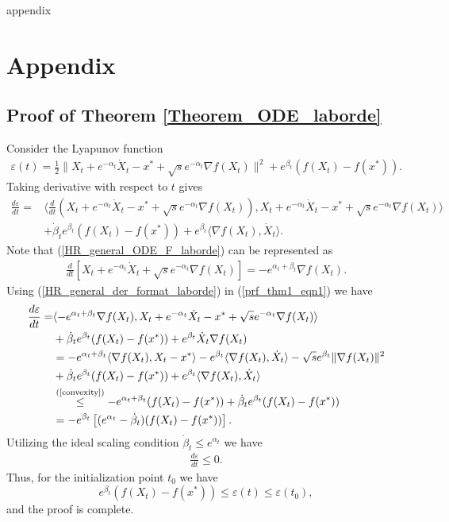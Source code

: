 \documentclass{article}
\theoremstyle{plain}
\theoremstyle{definition}
\theoremstyle{remark}
\begin{document}




appendix
\section{Appendix}
\subsection{Proof of Theorem \ref{Theorem_ODE_laborde}}\label{thm1_proof}
Consider the Lyapunov function 
\begin{align}\label{lyap_theorem_C}
    \varepsilon(t)=\frac{1}{2}\|X_t+e^{-\alpha_t}\dot X_t-x^*+\sqrt{s}e^{-\alpha_t}\nabla f(X_t)\|^2+e^{\beta_t}(f(X_t)-f(x^*)).
\end{align}
Taking derivative with respect to $t$ gives
\begin{align}\label{prf_thm1_eqn1}
    \frac{d \varepsilon}{dt}=&\langle \frac{d}{dt}(X_t+e^{-\alpha_t}\dot X_t-x^*+\sqrt{s}e^{-\alpha_t}\nabla f(X_t)),X_t+e^{-\alpha_t}\dot X_t-x^*+\sqrt{s}e^{-\alpha_t}\nabla f(X_t)\rangle\nonumber\\
    & +\dot \beta_t e^{\beta_t}(f(X_t)-f(x^*))+e^{\beta_t}\langle \nabla f(X_t), \dot X_t\rangle.
\end{align}
Note that (\ref{HR_general_ODE_F_laborde}) can be represented as
\begin{align}\label{HR_general_der_format_laborde}
    \frac{d}{dt}\left[X_t+e^{-\alpha_t}\dot X_t+\sqrt{s}e^{-\alpha_t}\nabla f(X_t)\right]=-e^{\alpha_t+\beta_t}\nabla f(X_t).
\end{align}
Using (\ref{HR_general_der_format_laborde}) in (\ref{prf_thm1_eqn1}) we have
\begin{align}
     \frac{d \varepsilon}{dt}=& \langle -e^{\alpha_t+\beta_t}\nabla f(X_t),X_t+e^{-\alpha_t}\dot X_t-x^*+\sqrt{s}e^{-\alpha_t}\nabla f(X_t) \rangle \nonumber \\
     &+\dot \beta_t e^{\beta_t}(f(X_t)-f(x^*))+e^{\beta_t}\dot X_t\nabla f(X_t)\nonumber\\
     &= -e^{\alpha_t+\beta_t}\langle\nabla f(X_t),X_t-x^*\rangle -e^{\beta_t}\langle \nabla f(X_t),\dot X_t\rangle -\sqrt{s}e^{\beta_t}\|\nabla f(X_t)\|^2\nonumber\\
     &+\dot \beta_te^{\beta_t}(f(X_t)-f(x^*))+e^{\beta_t}\langle \nabla f(X_t),\dot X_t \rangle\nonumber\\
     & \overset{\text{(\ref{convexity}})}{\leq} -e^{\alpha_t+\beta_t}(f(X_t)-f(x^*))+\dot \beta_te^{\beta_t}(f(X_t)-f(x^*))\nonumber\\
     & = -e^{\beta_t}\left[(e^{\alpha_t}-\dot \beta_t)(f(X_t)-f(x^*))\right].\nonumber
\end{align}
Utilizing the ideal scaling condition $\dot \beta_t\leq e^{\alpha_t}$ we have
\begin{align}
     \frac{d \varepsilon}{dt}\leq 0.\nonumber
\end{align}
Thus, for the initialization point $t_0$ we have
$$e^{\beta_t}(f(X_t)-f(x^*))\leq \varepsilon(t)\leq \varepsilon(t_0),$$
and the proof is complete.
\end{document}
